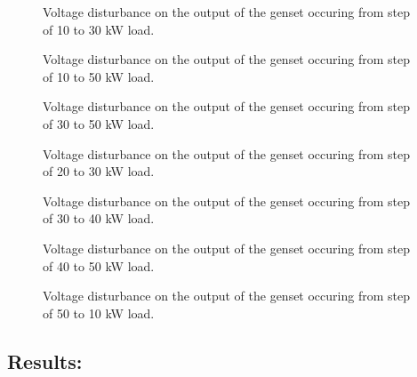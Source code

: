\begin{figure}[H]
\centering

\caption{Voltage disturbance on the output of the genset occuring from step of 10 to 30 kW load.}
\label{fig:test8-9-10to30kwstepvolt}
\end{figure}

\begin{figure}[H]
\centering

\caption{Voltage disturbance on the output of the genset occuring from step of 10 to 50 kW load.}
\label{fig:test8-9-10to50kwstepvolt}
\end{figure}

\begin{figure}[H]
\centering

\caption{Voltage disturbance on the output of the genset occuring from step of 30 to 50 kW load.}
\label{fig:test9-30to50kwstepvolt}
\end{figure}

\begin{figure}[H]
\centering

\caption{Voltage disturbance on the output of the genset occuring from step of 20 to 30 kW load.}
\label{fig:test8-9-20to30kwstepvolt}
\end{figure}

\begin{figure}[H]
\centering

\caption{Voltage disturbance on the output of the genset occuring from step of 30 to 40 kW load.}
\label{fig:test8-9-30to40kwstepvolt}
\end{figure}

\begin{figure}[H]
\centering

\caption{Voltage disturbance on the output of the genset occuring from step of 40 to 50 kW load.}
\label{fig:test8-9-40to50kwstepvolt}
\end{figure}

\begin{figure}[H]
\centering

\caption{Voltage disturbance on the output of the genset occuring from step of 50 to 10 kW load.}
\label{fig:test8-9-50to10kwstepvolt}
\end{figure}

\subsection*{Results:}





